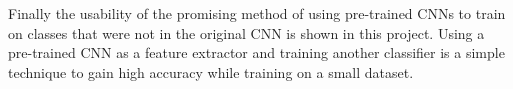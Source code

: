 Finally the usability of the promising method of using pre-trained CNNs to train on classes that were not in the original CNN is shown in this project.
Using a pre-trained CNN as a feature extractor and training another classifier is a simple technique to gain high accuracy while training on a small dataset.


